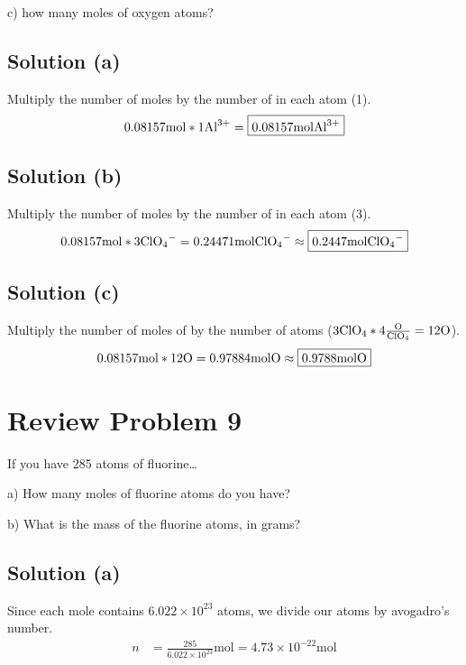 \documentclass[10pt]{article}
\begin{document}
        c) how many moles of oxygen atoms?

        \subsection{Solution (a)}
            Multiply the number of moles by the number of  in each atom (1).
            \begin{equation}
                0.08157 \unit{\mol} * 1 \ce{Al^3+} = \boxed{0.08157 \unit{\mol} \ce{Al^3+}}
            \end{equation}

        \subsection{Solution (b)}
            Multiply the number of moles by the number of  in each atom (3).
            \begin{equation}
                0.08157 \unit{\mol} * 3 \ce{ClO4-} = 0.24471 \unit{\mol} \ce{ClO4-} \approx \boxed{0.2447 \unit{\mol} \ce{ClO4-}}
            \end{equation}

        \subsection{Solution (c)}
            Multiply the number of moles of  by the number of  atoms ($ 3 \ce{ClO4} * 4 \ce{\frac{O}{ClO4}} = 12 \ce{O} $).
            \begin{equation}
                0.08157 \unit{\mol} * 12 \ce{O} = 0.97884 \unit{\mol} \ce{O} \approx \boxed{0.9788 \unit{\mol} \ce{O}}
            \end{equation}
    
    \pagebreak
    \section{Review Problem 9}
        If you have 285 atoms of fluorine…
        
        a) How many moles of fluorine atoms do you have?
        
        b) What is the mass of the fluorine atoms, in grams?

        \subsection{Solution (a)}
            Since each mole contains $6.022 \times 10^{23}$ atoms, we divide our atoms by avogadro's number.
            \begin{align}
                n   &=  \frac{285}{6.022 \times 10^{23}} \unit{\mol}
                    =   \boxed{4.73 \times 10^{-22} \unit{\mol}}
            \end{align}
\end{document}
